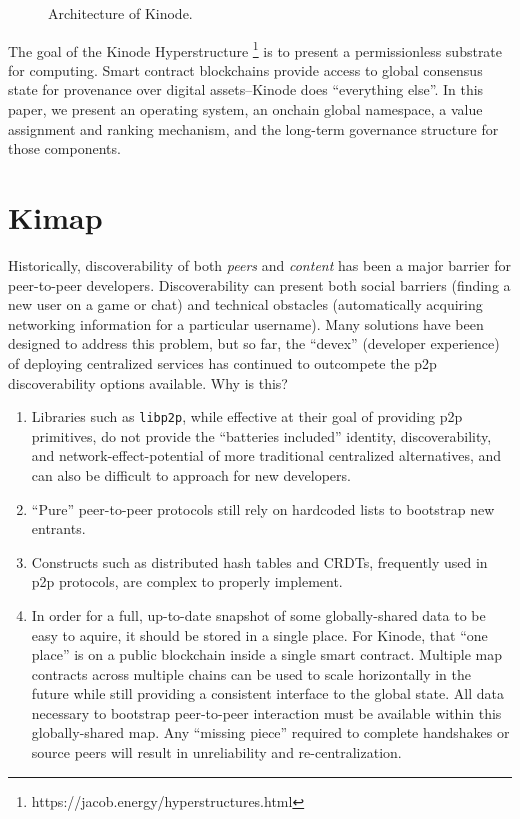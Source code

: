 \documentclass[runningheads]{llncs}
\begin{document}
\begin{figure}[H]
    \centering
    \caption{Architecture of Kinode.}
    \label{fig:triangle}
\end{figure}

The goal of the Kinode Hyperstructure
\footnote{https://jacob.energy/hyperstructures.html}
is to present a permissionless substrate for computing.
Smart contract blockchains provide access to global consensus state for provenance over digital assets–Kinode does ``everything else''.
In this paper, we present an operating system, an onchain global namespace, a value assignment and ranking mechanism, and the long-term governance structure for those components.

\section{Kimap}
\label{sec:kimap}

Historically, discoverability of both \textit{peers} and \textit{content} has been a major barrier for peer-to-peer developers.
Discoverability can present both social barriers (finding a new user on a game or chat) and technical obstacles (automatically acquiring networking information for a particular username).
Many solutions have been designed to address this problem, but so far, the ``devex'' (developer experience) of deploying centralized services has continued to outcompete the p2p discoverability options available.
Why is this?
\begin{enumerate}
    \item Libraries such as \verb|libp2p|, while effective at their goal of providing p2p primitives, do not provide the ``batteries included'' identity, discoverability, and network-effect-potential of more traditional centralized alternatives, and can also be difficult to approach for new developers.
    \item ``Pure'' peer-to-peer protocols still rely on hardcoded lists to bootstrap new entrants.
    \item Constructs such as distributed hash tables and CRDTs, frequently used in p2p protocols, are complex to properly implement.
    \item In order for a full, up-to-date snapshot of some globally-shared data to be easy to aquire, it should be stored in a single place.
    \subitem For Kinode, that ``one place'' is on a public blockchain inside a single smart contract.
    \subitem Multiple map contracts across multiple chains can be used to scale horizontally in the future while still providing a consistent interface to the global state.
    \subitem All data necessary to bootstrap peer-to-peer interaction must be available within this globally-shared map.
    \subitem Any ``missing piece'' required to complete handshakes or source peers will result in unreliability and re-centralization.
\end{enumerate}
\end{document}
